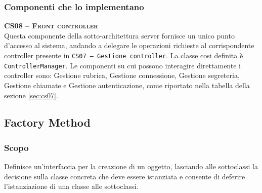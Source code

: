 \subsubsection{Componenti che lo implementano}
\begin{description}
  \item{\scshape\bfseries CS08 -- Front controller}\\
Questa componente della sotto-architettura server fornisce un unico punto d'accesso al sistema, andando a delegare le operazioni richieste al corrispondente controller presente in \texttt{CS07 -- Gestione controller}. La classe cosi definita è \texttt{ControllerManager}. Le componenti su cui possono interagire direttamente i controller sono: \textsf{Gestione rubrica}, \textsf{Gestione connessione}, \textsf{Gestione segreteria}, \textsf{Gestione chiamate} e \textsf{Gestione autenticazione}, come riportato nella tabella della sezione \vref{sec:cs07}.
\end{description}

\subsection{Factory Method}\label{sec:patternfactorymethod}

\subsubsection{Scopo}
Definisce un'interfaccia per la creazione di un oggetto, lasciando alle sottoclassi la decisione sulla classe concreta che deve essere istanziata e consente di deferire l'istanziazione di una classe alle sottoclassi.

